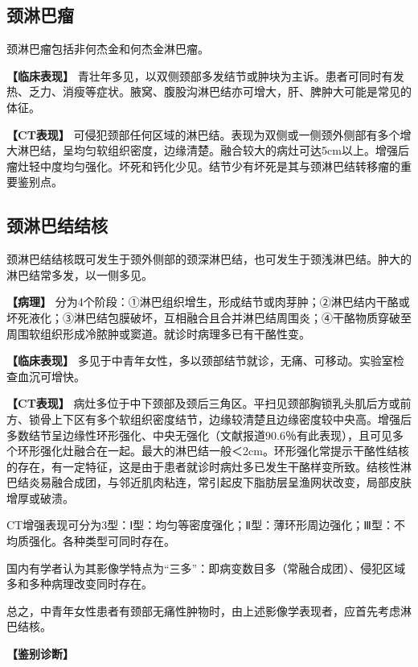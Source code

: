 \subsection{颈淋巴瘤}

颈淋巴瘤包括非何杰金和何杰金淋巴瘤。

\textbf{【临床表现】}
青壮年多见，以双侧颈部多发结节或肿块为主诉。患者可同时有发热、乏力、消瘦等症状。腋窝、腹股沟淋巴结亦可增大，肝、脾肿大可能是常见的体征。

\textbf{【CT表现】}
可侵犯颈部任何区域的淋巴结。表现为双侧或一侧颈外侧部有多个增大淋巴结，呈均匀软组织密度，边缘清楚。融合较大的病灶可达5cm以上。增强后瘤灶轻中度均匀强化。坏死和钙化少见。结节少有坏死是其与颈淋巴结转移瘤的重要鉴别点。

\subsection{颈淋巴结结核}

颈淋巴结结核既可发生于颈外侧部的颈深淋巴结，也可发生于颈浅淋巴结。肿大的淋巴结常多发，以一侧多见。

\textbf{【病理】}
分为4个阶段：①淋巴组织增生，形成结节或肉芽肿；②淋巴结内干酪或坏死液化；③淋巴结包膜破坏，互相融合且合并淋巴结周围炎；④干酪物质穿破至周围软组织形成冷脓肿或窦道。就诊时病理多已有干酪性变。

\textbf{【临床表现】}
多见于中青年女性，多以颈部结节就诊，无痛、可移动。实验室检查血沉可增快。

\textbf{【CT表现】}
病灶多位于中下颈部及颈后三角区。平扫见颈部胸锁乳头肌后方或前方、锁骨上下区有多个软组织密度结节，边缘较清楚且边缘密度较中央高。增强后多数结节呈边缘性环形强化、中央无强化（文献报道90.6％有此表现），且可见多个环形强化灶融合在一起。最大的淋巴结一般＜2cm。环形强化常提示干酪性结核的存在，有一定特征，这是由于患者就诊时病灶多已发生干酪样变所致。结核性淋巴结炎易融合成团，与邻近肌肉粘连，常引起皮下脂肪层呈渔网状改变，局部皮肤增厚或破溃。

CT增强表现可分为3型：Ⅰ型：均匀等密度强化；Ⅱ型：薄环形周边强化；Ⅲ型：不均质强化。各种类型可同时存在。

国内有学者认为其影像学特点为“三多”：即病变数目多（常融合成团）、侵犯区域多和多种病理改变同时存在。

总之，中青年女性患者有颈部无痛性肿物时，由上述影像学表现者，应首先考虑淋巴结核。

\textbf{【鉴别诊断】}

